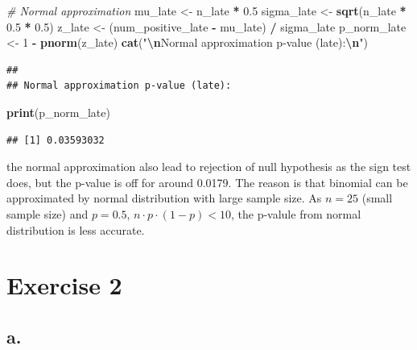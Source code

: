 \documentclass[
]{article}
\newenvironment{Shaded}{\begin{snugshade}}{\end{snugshade}}
\newcommand{\CommentTok}[1]{\textcolor[rgb]{0.56,0.35,0.01}{\textit{#1}}}
\newcommand{\DecValTok}[1]{\textcolor[rgb]{0.00,0.00,0.81}{#1}}
\newcommand{\FloatTok}[1]{\textcolor[rgb]{0.00,0.00,0.81}{#1}}
\newcommand{\FunctionTok}[1]{\textcolor[rgb]{0.13,0.29,0.53}{\textbf{#1}}}
\newcommand{\NormalTok}[1]{#1}
\newcommand{\OtherTok}[1]{\textcolor[rgb]{0.56,0.35,0.01}{#1}}
\newcommand{\SpecialCharTok}[1]{\textcolor[rgb]{0.81,0.36,0.00}{\textbf{#1}}}
\newcommand{\StringTok}[1]{\textcolor[rgb]{0.31,0.60,0.02}{#1}}
\begin{document}
\begin{Shaded}
\begin{Highlighting}[]
\CommentTok{\# Normal approximation}
\NormalTok{mu\_late }\OtherTok{\textless{}{-}}\NormalTok{ n\_late }\SpecialCharTok{*} \FloatTok{0.5}
\NormalTok{sigma\_late }\OtherTok{\textless{}{-}} \FunctionTok{sqrt}\NormalTok{(n\_late }\SpecialCharTok{*} \FloatTok{0.5} \SpecialCharTok{*} \FloatTok{0.5}\NormalTok{)}
\NormalTok{z\_late }\OtherTok{\textless{}{-}}\NormalTok{ (num\_positive\_late }\SpecialCharTok{{-}}\NormalTok{ mu\_late) }\SpecialCharTok{/}\NormalTok{ sigma\_late}
\NormalTok{p\_norm\_late }\OtherTok{\textless{}{-}} \DecValTok{1} \SpecialCharTok{{-}} \FunctionTok{pnorm}\NormalTok{(z\_late)}
\FunctionTok{cat}\NormalTok{(}\StringTok{"}\SpecialCharTok{\textbackslash{}n}\StringTok{Normal approximation p{-}value (late):}\SpecialCharTok{\textbackslash{}n}\StringTok{"}\NormalTok{)}
\end{Highlighting}
\end{Shaded}

\begin{verbatim}
## 
## Normal approximation p-value (late):
\end{verbatim}

\begin{Shaded}
\begin{Highlighting}[]
\FunctionTok{print}\NormalTok{(p\_norm\_late)}
\end{Highlighting}
\end{Shaded}

\begin{verbatim}
## [1] 0.03593032
\end{verbatim}

the normal approximation also lead to rejection of null hypothesis as
the sign test does, but the p-value is off for around 0.0179. The reason
is that binomial can be approximated by normal distribution with large
sample size. As \(n = 25\) (small sample size) and \(p = 0.5\),
\(n \cdot p \cdot(1-p) < 10\), the p-valule from normal distribution is
less accurate.

\section{Exercise 2}\label{exercise-2}

\subsection{a.}\label{a.-1}
\end{document}
